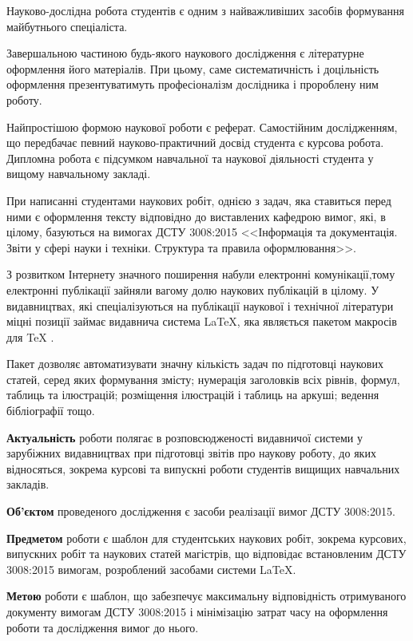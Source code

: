 
Науково-дослідна робота студентів є одним з найважливіших засобів формування майбутнього спеціаліста.

Завершальною частиною будь-якого наукового дослідження є літературне оформлення його матеріалів. При цьому, саме систематичність і доцільність оформлення презентуватимуть професіоналізм дослідника і пророблену ним роботу.

Найпростішою формою наукової роботи є реферат. Самостійним   дослідженням, що передбачає певний науково-практичний досвід студента є курсова робота. Дипломна робота є підсумком навчальної та  наукової діяльності студента у вищому навчальному закладі.

При написанні студентами наукових робіт, однією з задач, яка ставиться перед ними є оформлення тексту відповідно до виставлених кафедрою вимог, які, в цілому, базуються на вимогах ДСТУ 3008:2015 <<Інформація та документація. Звіти у сфері науки і техніки. Структура та правила оформлювання>>.

З розвитком Інтернету значного поширення набули електронні комунікації,тому електронні публікації зайняли вагому долю наукових публікацій в цілому. У видавництвах, які спеціалізуються на публікації наукової і технічної літератури міцні позиції займає видавнича система  \LaTeX{}, яка являється пакетом макросів для \TeX{} \cite{Knuth1984TheTeXbook}.

Пакет дозволяє автоматизувати значну кількість задач по підготовці наукових статей, серед яких формування змісту; нумерація заголовків всіх рівнів, формул, таблиць та ілюстрацій; розміщення ілюстрацій і таблиць на аркуші; ведення бібліографії тощо.

\textbf{Актуальність} роботи полягає в розповсюдженості видавничої системи у зарубіжних видавництвах при підготовці звітів про наукову роботу, до яких відносяться, зокрема курсові та випускні роботи студентів вищищих навчальних закладів.

\textbf{Об'єктом} проведеного дослідження є засоби реалізації вимог ДСТУ 3008:2015. 

\textbf{Предметом} роботи є шаблон для студентських наукових робіт, зокрема курсових, випускних робіт та наукових статей магістрів, що відповідає встановленим ДСТУ 3008:2015 вимогам, розроблений засобами системи \LaTeX{}.

\textbf{Метою} роботи є шаблон, що забезпечує максимальну відповідність отримуваного документу вимогам ДСТУ 3008:2015 і мінімізацію затрат часу на оформлення роботи та дослідження вимог до нього.

